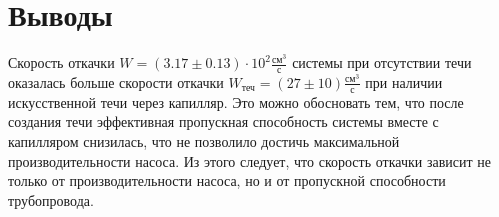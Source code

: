 \section{Выводы}
Скорость откачки $W = (3.17\pm0.13)\cdot 10^2\frac{\text{см}^3}{\text{с}}$ системы при отсутствии течи оказалась больше скорости откачки $W_\text{теч} = (27\pm10)\frac{\text{см}^3}{\text{с}}$ при наличии искусственной течи через капилляр. Это можно обосновать тем, что после создания течи эффективная пропускная способность системы вместе с капилляром снизилась, что не позволило достичь максимальной производительности насоса. Из этого следует, что скорость откачки зависит не только от производительности насоса, но и от пропускной способности трубопровода.